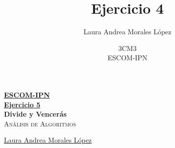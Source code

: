 \documentclass[12pt, fleqn]{article}                             %
\author{Laura Andrea Morales López}              %
\title{Ejercicio 4}
\author{3CM3\\
	ESCOM-IPN}
\theoremstyle{break}                                            %
\begin{document}
\begin{titlepage}
    
    \pagecolor{amaranth}                                      %
    \color{classicrose}                                                   %

    \vspace                                                         %
    \baselineskip                                                   %

    \makebox[0pt][l]{\rule{1.3\textwidth}{3pt}}                     %
    
    \href{https://compilandoconocimiento.com}                       %
    {\textbf{\textsc{\Huge ESCOM-IPN}}}\\[2.7cm]                    %

    \href{\ProjectNameLink/}                       %
    {\fontsize{36}{50}                                              %
        \selectfont \textbf{Ejercicio 5}}\\[0.5cm]       %
    {\fontsize{36}{50}                                              %
        \selectfont \textbf{Divide y Vencerás}}\\[0.5cm]                %
    \textcolor{bittersweet}                                        %
        {\textsc{\LARGE Análisis de Algoritmos}}     %
    
    \vfill                                                          %
    
    \href{https://compilandoconocimiento.com/}                    %
    {\LARGE \textsf{Laura Andrea Morales López}}   %

    \vspace                                                         %
    \baselineskip                                                   %
    

\end{titlepage}
\end{document}
